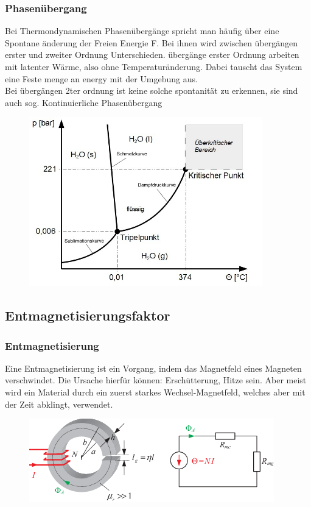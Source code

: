         \subsubsection*{Phasenübergang}
            Bei Thermondynamischen Phasenübergänge spricht man häufig über eine Spontane änderung der Freien Energie F.
            Bei ihnen wird zwischen übergängen erster und zweiter Ordnung Unterschieden. übergänge erster Ordnung
            arbeiten mit latenter Wärme, also ohne Temperaturänderung. Dabei tauscht das System eine Feste menge an energy
            mit der Umgebung aus.\\
            Bei übergängen 2ter ordnung ist keine solche spontanität zu erkennen, sie sind auch sog. Kontinuierliche Phasenübergang
            \begin{figure}[H]
                \centering
                \includegraphics[width=0.9\textwidth]{Images/waterphase.jpg}
            \end{figure}
    \subsection{Entmagnetisierungsfaktor}

        \subsubsection*{Entmagnetisierung}
            Eine Entmagnetisierung ist ein Vorgang, indem das Magnetfeld eines Magneten verschwindet.
            Die Ursache hierfür können: Erschütterung, Hitze sein. Aber meist wird ein Material
            durch ein zuerst starkes Wechsel-Magnetfeld, welches aber mit der Zeit abklingt, verwendet.
            \begin{figure}[H]
                \centering
                \includegraphics{images/Ringkern}
            \end{figure}

